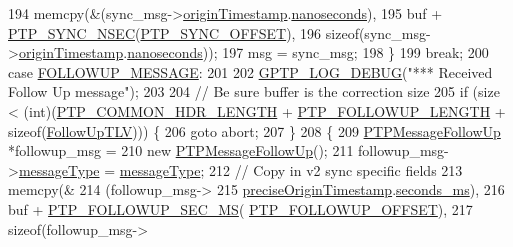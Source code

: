 \begin{DoxyCode}
{{{{{{194             memcpy(&(sync\_msg->\hyperlink{class_p_t_p_message_sync_a57a4bfcce938833de582c2ed5138aa3b}{originTimestamp}.\hyperlink{class_timestamp_a78ae11d98fcfe738239d0a853d82c84a}{nanoseconds}),
195                    buf + \hyperlink{avbts__message_8hpp_af15f1cc9fd51ec5b1b4bd604f70292d0}{PTP\_SYNC\_NSEC}(\hyperlink{avbts__message_8hpp_a6306aedd2fe6dbaf36910d15e9dadbfd}{PTP\_SYNC\_OFFSET}),
196                    \textcolor{keyword}{sizeof}(sync\_msg->\hyperlink{class_p_t_p_message_sync_a57a4bfcce938833de582c2ed5138aa3b}{originTimestamp}.\hyperlink{class_timestamp_a78ae11d98fcfe738239d0a853d82c84a}{nanoseconds}));
197             msg = sync\_msg;
198         \}
199         \textcolor{keywordflow}{break};
200     \textcolor{keywordflow}{case} \hyperlink{avbts__message_8hpp_ac6606ebe91c8ac66a2c314c79f5ab013a9a003449758340b855b445c50b6c3b0d}{FOLLOWUP\_MESSAGE}:
201 
202         \hyperlink{gptp__log_8hpp_ae4c6efe7c9cf6d7d3bbd28a0fd087d61}{GPTP\_LOG\_DEBUG}(\textcolor{stringliteral}{"*** Received Follow Up message"});
203 
204         \textcolor{comment}{// Be sure buffer is the correction size}
205         \textcolor{keywordflow}{if} (size < (\textcolor{keywordtype}{int})(\hyperlink{avbts__message_8hpp_a8ec4d965b7b1e83844f1c17f12e9b8e4}{PTP\_COMMON\_HDR\_LENGTH} + 
      \hyperlink{avbts__message_8hpp_a7db8f880133691145b633e681fea9d27}{PTP\_FOLLOWUP\_LENGTH} + \textcolor{keyword}{sizeof}(\hyperlink{class_follow_up_t_l_v}{FollowUpTLV}))) \{
206             \textcolor{keywordflow}{goto} abort;
207         \}
208         \{
209             \hyperlink{class_p_t_p_message_follow_up}{PTPMessageFollowUp} *followup\_msg =
210                 \textcolor{keyword}{new} \hyperlink{class_p_t_p_message_follow_up_a88f99fa4a1dff66f8c05b8492c23e5cd}{PTPMessageFollowUp}();
211             followup\_msg->\hyperlink{class_p_t_p_message_common_adb32627aa5b0e2dbad3ccd88aab07c05}{messageType} = \hyperlink{class_p_t_p_message_common_adb32627aa5b0e2dbad3ccd88aab07c05}{messageType};
212             \textcolor{comment}{// Copy in v2 sync specific fields}
213             memcpy(&
214                    (followup\_msg->
215                 \hyperlink{class_p_t_p_message_follow_up_ab410646215c0bcbaf124d5923f22e2ca}{preciseOriginTimestamp}.\hyperlink{class_timestamp_a5d98378d782519e6f9c17db70f1620f0}{seconds\_ms}),
216                    buf + \hyperlink{avbts__message_8hpp_a8bc5c60f52c4f491a6e86c43ec5ddc66}{PTP\_FOLLOWUP\_SEC\_MS}(
      \hyperlink{avbts__message_8hpp_af54dd338e8c2b906b028746fbecdb74d}{PTP\_FOLLOWUP\_OFFSET}),
217                    \textcolor{keyword}{sizeof}(followup\_msg->
}}}}}}
\end{DoxyCode}
